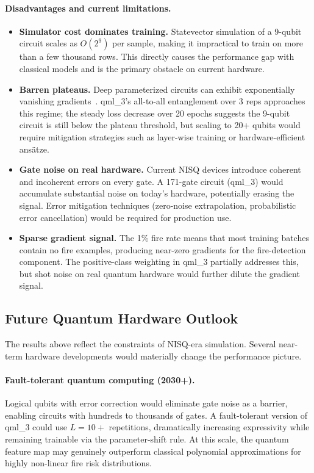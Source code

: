 \documentclass[11pt,a4paper]{article}
\begin{document}
\paragraph{Disadvantages and current limitations.}
\begin{itemize}[leftmargin=*]
    \item \textbf{Simulator cost dominates training.} Statevector simulation of
          a 9-qubit circuit scales as $O(2^9)$ per sample, making it impractical
          to train on more than a few thousand rows. This directly causes the
          performance gap with classical models and is the primary obstacle on
          current hardware.
    \item \textbf{Barren plateaus.} Deep parameterized circuits can exhibit
          exponentially vanishing gradients~\cite{cerezo2021vqe}. qml\_3's
          all-to-all entanglement over 3 reps approaches this regime; the
          steady loss decrease over 20 epochs suggests the 9-qubit circuit is
          still below the plateau threshold, but scaling to 20+ qubits would
          require mitigation strategies such as layer-wise training or
          hardware-efficient ans\"atze.
    \item \textbf{Gate noise on real hardware.} Current NISQ devices introduce
          coherent and incoherent errors on every gate. A 171-gate circuit (qml\_3)
          would accumulate substantial noise on today's hardware, potentially
          erasing the signal. Error mitigation techniques (zero-noise extrapolation,
          probabilistic error cancellation) would be required for production use.
    \item \textbf{Sparse gradient signal.} The 1\% fire rate means that most
          training batches contain no fire examples, producing near-zero gradients
          for the fire-detection component. The positive-class weighting in
          qml\_3 partially addresses this, but shot noise on real quantum hardware
          would further dilute the gradient signal.
\end{itemize}

\subsection{Future Quantum Hardware Outlook}

The results above reflect the constraints of NISQ-era simulation. Several
near-term hardware developments would materially change the performance picture.

\paragraph{Fault-tolerant quantum computing (2030+).}
Logical qubits with error correction would eliminate gate noise as a barrier,
enabling circuits with hundreds to thousands of gates. A fault-tolerant version
of qml\_3 could use $L = 10{+}$ repetitions, dramatically increasing expressivity
while remaining trainable via the parameter-shift rule. At this scale, the
quantum feature map may genuinely outperform classical polynomial approximations
for highly non-linear fire risk distributions.
\end{document}
